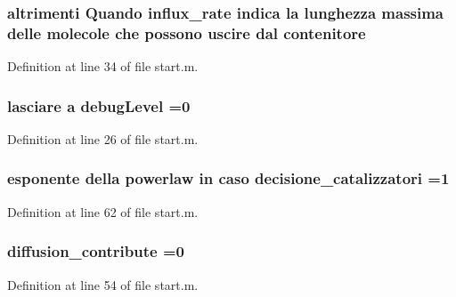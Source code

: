 \hypertarget{a00071_a8fcf98921930aa3720acdd081c5b0c2f}{
\subsubsection[{contenitore}]{\setlength{\rightskip}{0pt plus 5cm}altrimenti Quando {\bf influx\-\_\-rate} indica la {\bf lunghezza} massima delle molecole che possono uscire dal contenitore}}\label{a00071_a8fcf98921930aa3720acdd081c5b0c2f}


Definition at line 34 of file start.\-m.

\hypertarget{a00071_a08ef28bc85447e904ca9ea64de89b676}{
\subsubsection[{debug\-Level}]{\setlength{\rightskip}{0pt plus 5cm}lasciare {\bf a} debug\-Level =0}}\label{a00071_a08ef28bc85447e904ca9ea64de89b676}


Definition at line 26 of file start.\-m.

\hypertarget{a00071_a78948f867453293fcff0835b1bb05b8c}{
\subsubsection[{decisione\-\_\-catalizzatori}]{\setlength{\rightskip}{0pt plus 5cm}esponente della powerlaw in caso decisione\-\_\-catalizzatori =1}}\label{a00071_a78948f867453293fcff0835b1bb05b8c}


Definition at line 62 of file start.\-m.

\hypertarget{a00071_a9341167cb56ed18499df723220990b9c}{
\subsubsection[{diffusion\-\_\-contribute}]{\setlength{\rightskip}{0pt plus 5cm}diffusion\-\_\-contribute =0}}\label{a00071_a9341167cb56ed18499df723220990b9c}


Definition at line 54 of file start.\-m.

